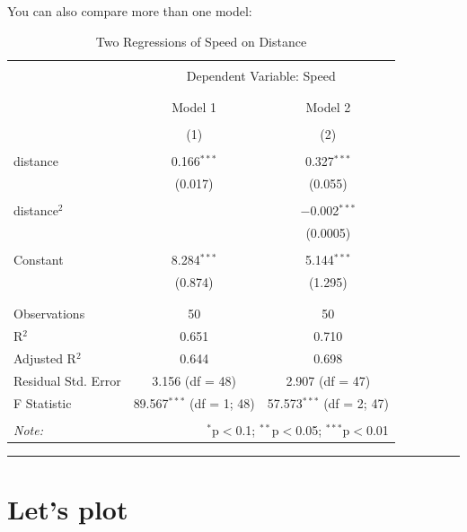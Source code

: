 \documentclass[
]{article}
\begin{document}
You can also compare more than one model:

\begin{table}[H] \centering 
  \caption{Two Regressions of Speed on Distance} 
  \label{} 
\begin{tabular}{@{\extracolsep{5pt}}lcc} 
\\[-1.8ex]\hline 
\hline \\[-1.8ex] 
 & \multicolumn{2}{c}{Dependent Variable: Speed} \\ 
\cline{2-3} 
\\[-1.8ex] & \multicolumn{2}{c}{} \\ 
 & Model 1 & Model 2 \\ 
\\[-1.8ex] & (1) & (2)\\ 
\hline \\[-1.8ex] 
 distance & 0.166$^{***}$ & 0.327$^{***}$ \\ 
  & (0.017) & (0.055) \\ 
  & & \\ 
 distance$^2$ &  & $-$0.002$^{***}$ \\ 
  &  & (0.0005) \\ 
  & & \\ 
 Constant & 8.284$^{***}$ & 5.144$^{***}$ \\ 
  & (0.874) & (1.295) \\ 
  & & \\ 
\hline \\[-1.8ex] 
Observations & 50 & 50 \\ 
R$^{2}$ & 0.651 & 0.710 \\ 
Adjusted R$^{2}$ & 0.644 & 0.698 \\ 
Residual Std. Error & 3.156 (df = 48) & 2.907 (df = 47) \\ 
F Statistic & 89.567$^{***}$ (df = 1; 48) & 57.573$^{***}$ (df = 2; 47) \\ 
\hline 
\hline \\[-1.8ex] 
\textit{Note:}  & \multicolumn{2}{r}{$^{*}$p$<$0.1; $^{**}$p$<$0.05; $^{***}$p$<$0.01} \\ 
\end{tabular} 
\end{table}

\begin{center}\rule{0.5\linewidth}{0.5pt}\end{center}

\hypertarget{lets-plot}{%
\section{Let's plot}\label{lets-plot}}
\end{document}
